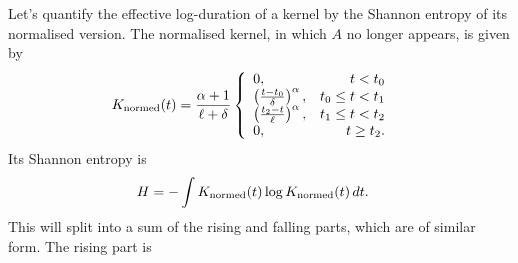 \documentclass[a4paper, 12pt]{article}
\begin{document}
Let's quantify the effective log-duration of a kernel by the Shannon entropy of
its normalised version. The normalised kernel, in which $A$ no longer appears,
is given by
\begin{align}
K_{\rm normed}(t) &=
    \frac{\alpha+1}{\ell+\delta}
    \left\{
        \begin{array}{lr}
            0, & t < t_0 \\
            \left(\frac{t - t_0}{\delta}\right)^\alpha, & t_0 \leq t < t_1 \\
            \left(\frac{t_2 - t}{\ell}  \right)^\alpha, & t_1 \leq t < t_2 \\
            0, & t \geq t_2.
        \end{array}
    \right.
\end{align}
Its Shannon entropy is
\begin{align}
H &= -\int K_{\rm normed}(t) \log K_{\rm normed}(t) \, dt.
\end{align}
This will split into a sum of the rising and falling parts, which are of
similar form. The rising part is
\end{document}
